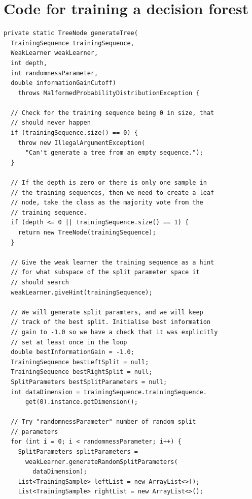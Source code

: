 \documentclass[12pt,twoside,notitlepage]{report}
\begin{document}

\cleardoublepage
\chapter{Code for training a decision forest} \label{app:train_tree}
    
    \begin{lstlisting}[float=tp,caption={The implementation code for tree generation.}, label={lst:actualGenerateTree}]
private static TreeNode generateTree(
  TrainingSequence trainingSequence, 
  WeakLearner weakLearner, 
  int depth, 
  int randomnessParameter, 
  double informationGainCutoff) 
    throws MalformedProbabilityDistributionException {

  // Check for the training sequence being 0 in size, that 
  // should never happen
  if (trainingSequence.size() == 0) {
    throw new IllegalArgumentException(
      "Can't generate a tree from an empty sequence.");
  }
  
  // If the depth is zero or there is only one sample in 
  // the training sequences, then we need to create a leaf 
  // node, take the class as the majority vote from the 
  // training sequence.
  if (depth <= 0 || trainingSequence.size() == 1) {
    return new TreeNode(trainingSequence);
  }
  
  // Give the weak learner the training sequence as a hint
  // for what subspace of the split parameter space it 
  // should search
  weakLearner.giveHint(trainingSequence);
  
  // We will generate split paramters, and we will keep 
  // track of the best split. Initialise best information 
  // gain to -1.0 so we have a check that it was explicitly 
  // set at least once in the loop 
  double bestInformationGain = -1.0;
  TrainingSequence bestLeftSplit = null;
  TrainingSequence bestRightSplit = null;
  SplitParameters bestSplitParameters = null;
  int dataDimension = trainingSequence.trainingSequence.
      get(0).instance.getDimension();
  
  // Try "randomnessParameter" number of random split 
  // parameters
  for (int i = 0; i < randomnessParameter; i++) {
    SplitParameters splitParameters = 
      weakLearner.generateRandomSplitParameters(
        dataDimension);
    List<TrainingSample> leftList = new ArrayList<>();
    List<TrainingSample> rightList = new ArrayList<>();
    

\end{lstlisting}
\end{document}
